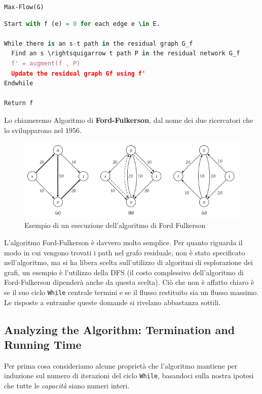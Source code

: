 \texttt{Max-Flow(G)}

\begin{lstlisting}[language=Python, mathescape=true]
Start with f (e) = 0 for each edge e \in E.
  
While there is an s-t path in the residual graph G_f
  Find an s \rightsquigarrow t path P in the residual network G_f
  f' = augment(f , P)
  Update the residual graph Gf using f'
Endwhile

Return f

\end{lstlisting}

Lo chiameremo Algoritmo di \textbf{Ford-Fulkerson}, dal nome dei due
ricercatori che lo svilupparono nel 1956.

\begin{figure}[H]
    \centering
    \includegraphics[width = 12 cm]{Network_flow/imgs/flow3.png}
    \caption{Esempio di un esecuzione dell'algoritmo di Ford Fulkerson}
\end{figure}

L'algoritmo Ford-Fulkerson è davvero molto semplice. Per quanto riguarda
il modo in cui vengono trovati i path nel grafo residuale, non è stato
specificato nell'algoritmo, ma si ha libera scelta sull'utilizzo di
algoritmi di esplorazione dei grafi, un esempio è l'utilizzo della DFS
(il costo complessivo dell'algoritmo di Ford-Fulkerson dipenderà anche
da questa scelta). Ciò che non è affatto chiaro è se il suo ciclo
\texttt{While} centrale termini e se il flusso restituito sia un flusso
massimo. Le risposte a entrambe queste domande si rivelano abbastanza
sottili.

\subsection{Analyzing the Algorithm: Termination and Running Time}

Per prima cosa consideriamo alcune proprietà che l'algoritmo mantiene
per induzione sul numero di iterazioni del ciclo \texttt{While},
basandoci sulla nostra ipotesi che tutte le \emph{capacità} siano numeri
interi.

